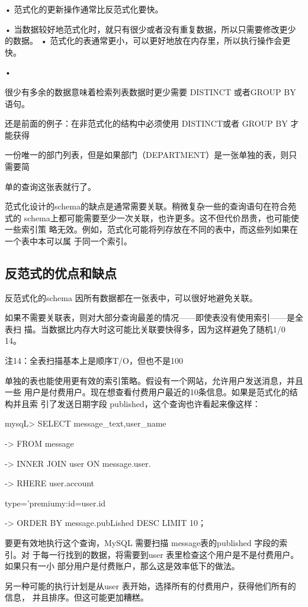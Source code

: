 • 范式化的更新操作通常比反范式化要快。

• 当数据较好地范式化时，就只有很少或者没有重复数据，所以只需要修改更少的数据。
• 范式化的表通常更小，可以更好地放在内存里，所以执行操作会更快。

•

很少有多余的数据意味着检索列表数据时更少需要 DISTINCT 或者GROUP BY 语句。

还是前面的例子：在非范式化的结构中必须使用 DISTINCT或者 GROUP BY 才能获得

一份唯一的部门列表，但是如果部门（DEPARTMENT）是一张单独的表，则只需要简

单的查询这张表就行了。

范式化设计的schema的缺点是通常需要关联。稍微复杂一些的查询语句在符合苑式的
schema上都可能需要至少一次关联，也许更多。这不但代价昂贵，也可能使一些索引策
略无效。例如，范式化可能将列存放在不同的表中，而这些列如果在一个表中本可以属
于同一个索引。

\subsection{反范式的优点和缺点}
反范式化的schema 因所有数据都在一张表中，可以很好地避免关联。

如果不需要关联表，则对大部分查询最差的情况——即使表没有使用索引——是全表扫
描。当数据比内存大时这可能比关联要快得多，因为这样避免了随机1/0 14。

注14：全表扫描基本上是顺序T/O，但也不是100%

单独的表也能使用更有效的索引策略。假设有一个网站，允许用户发送消息，并且一些
用户是付费用户。现在想查看付费用户最近的10条信息。如果是范式化的结构并且索
引了发送日期字段 published，这个查询也许看起来像这样：

mysqL> SELECT message\_text,user\_name

-> FROM message

-> INNER JOIN user ON message.user.

-> RHERE user.account

type='premiumy:id=user.id

-> ORDER BY message.pubLished DESC LIMIT 10；

要更有效地执行这个查询，MySQL 需要扫描 message表的published 字段的索引。对
于每一行找到的数据，将需要到user 表里检查这个用户是不是付费用户。如果只有一小
部分用户是付费账户，那么这是效率低下的做法。

另一种可能的执行计划是从user 表开始，选择所有的付费用户，获得他们所有的信息，
并且排序。但这可能更加糟糕。

